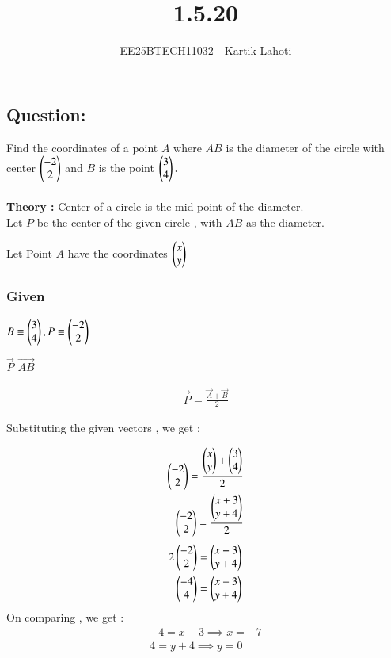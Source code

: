 \documentclass[journal]{IEEEtran}
\numberwithin{equation}{enumi}
\numberwithin{figure}{enumi}
\begin{document}

\vspace{3cm}

\title{1.5.20}
\author{EE25BTECH11032 - Kartik Lahoti}
\maketitle

\subsection*{\textbf{Question:} } 
Find the coordinates of a point $A$ where $AB$ is the diameter of the circle with center $\begin{pmatrix}-2\\2 \end{pmatrix}$ and $B$ is the point $\begin{pmatrix}3\\4\end{pmatrix}.$\\
\solution \\ 

\underline{\textbf{Theory :}} Center of a circle is the mid-point of the diameter. \\

Let $P$ be the center of the given circle , with $AB$ as the diameter.

Let Point $A$ have the coordinates $\begin{pmatrix}x\\y\end{pmatrix}$
\subsubsection*{Given }
 $B \equiv \begin{pmatrix}3 \\ 4\end{pmatrix} , P \equiv \begin{pmatrix}-2\\2\end{pmatrix}$ 
 
 $\vec{P}$  $\vec{AB}$ 

\begin{align}    
    \vec{P} = \frac{\vec{A} + \vec{B}}{2}  
\end{align}

Substituting the given vectors , we get : 

\begin{align}
    \begin{pmatrix}-2\\2\end{pmatrix} = \frac{\begin{pmatrix}x\\y\end{pmatrix} + \begin{pmatrix}3 \\ 4\end{pmatrix}}{2} \\ 
    \begin{pmatrix}-2\\2\end{pmatrix} = \frac{\begin{pmatrix}x+3 \\ y +4 \end{pmatrix}}{2}     
\end{align}
\begin{align}
    2\begin{pmatrix}-2\\2\end{pmatrix} = \begin{pmatrix}x+3 \\ y +4 \end{pmatrix} \\ 
    \begin{pmatrix}-4\\4\end{pmatrix} = \begin{pmatrix}x+3 \\ y +4 \end{pmatrix}
\end{align}
On comparing , we get : 
\begin{align}
    -4 = x +3 \implies x = -7\\
    4 = y + 4 \implies y = 0 
\end{align} 
\end{document}
